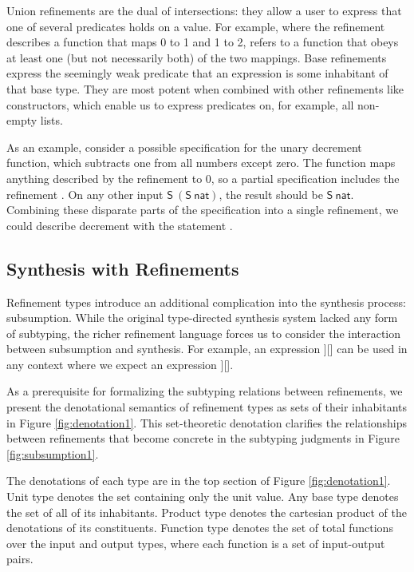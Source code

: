 Union refinements are the dual of intersections: they allow a user to express that one of several
predicates holds on a value.  For example, where the refinement 
describes a function that maps 0 to 1 and 1 to 2,  refers to a
function that obeys at least one (but not necessarily both) of the two mappings.
Base refinements express the seemingly weak predicate that an expression
is some inhabitant of that base type.  They are most potent when combined with other refinements like
constructors, which enable us to express predicates on, for example, all non-empty lists.

As an example, consider a possible specification for the unary
decrement function, which subtracts one from all numbers except zero.
The function maps anything described
by the refinement \TOrs[0, 1] to 0, so a partial specification includes the refinement
.  On any other input $\mathsf{S~(S~nat)}$, the result should be
$\mathsf{S~nat}$.  Combining these disparate parts of the specification into a single
refinement, we could describe decrement with the statement
.

\subsection{Synthesis with Refinements}

Refinement types introduce an additional complication into the synthesis process: subsumption.
While the original type-directed synthesis system lacked any form of subtyping, the richer
refinement language forces us to consider the interaction between subsumption and synthesis.
For example, an expression \HasType[\Refines[\DExp][\mathsf{S~(S~nat)}]][] can be
used in any context where we expect an expression
\HasType[\Refines[\DExp'][\mathsf{S~nat}]][].

As a prerequisite for formalizing the subtyping relations between refinements, we present
the denotational semantics of refinement types as sets of their inhabitants in Figure
\ref{fig:denotation1}.  This set-theoretic denotation clarifies the relationships between
refinements that become concrete in the subtyping judgments in Figure \ref{fig:subsumption1}.

The denotations of each type are in the top section of Figure \ref{fig:denotation1}.  Unit type
denotes the set containing only the unit value.
Any base type denotes the set of all of its inhabitants.
Product type denotes the cartesian product of the denotations of its constituents.
Function type denotes the set of total functions over the input and output types,
where each function is a set of input-output pairs.

